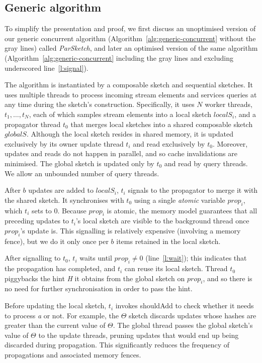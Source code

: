 \subsection{Generic algorithm}
\label{sec:basic-generic-alg}

To simplify the presentation and proof, we first discuss an unoptimised version of
our generic concurrent algorithm (Algorithm~\ref{alg:generic-concurrent} without the gray lines)  called 
\emph{ParSketch},
and later an optimised version of the same algorithm (Algorithm~\ref{alg:generic-concurrent} including the gray lines
and excluding underscored line~\ref{l:signal}).

The algorithm is instantiated by a composable sketch and sequential sketches.
It uses multiple threads to process incoming stream elements 
and services queries at any time during the sketch's construction.
Specifically, it uses $N$ worker threads, $t_1,\dots,t_N$, each of which samples
stream elements into a local sketch $localS_i$, and a propagator thread $t_0$ that merges local sketches
into a shared composable sketch $globalS$. Although the local sketch resides in
shared memory, it is updated exclusively by its owner update thread $t_i$ and 
read exclusively by $t_0$. Moreover, updates and reads do not happen in
parallel, and so cache invalidations are minimised. The global sketch is updated only by $t_0$
and read by query threads. We allow an unbounded number of query threads. 

After $b$ updates are added to $localS_i$, $t_i$ signals to the propagator to merge
it with the shared sketch. It synchronises with $t_0$ using a 
single \emph{atomic} variable $prop_i$, which $t_i$ sets to 0.  
Because $prop_i$ is atomic, the memory model
guarantees that all preceding updates to $t_i$'s local sketch are visible to
the background thread once $prop_i$'s update is.
This signalling is relatively expensive (involving a memory fence),  
but we do it only once per $b$ items retained in the local sketch.

After signalling to $t_0$, $t_i$ waits
until $prop_i \neq 0$  (line~\ref{l:wait}); 
this indicates that the propagation has completed, and $t_i$ can 
reuse its local sketch. Thread $t_0$ piggybacks the hint \emph{H} it
obtains from the global sketch on $prop_i$,
and so there is no need for further synchronisation in order to pass the hint.

Before updating the local sketch, $t_i$ invokes shouldAdd to check
whether it needs to process \emph{a} or not. For example, the $\Theta$ sketch discards updates whose hashes are
greater than the current value of $\Theta$. The global thread passes the global sketch's
value of $\Theta$ to the update threads, pruning updates that would end up being discarded
during propagation. This significantly
reduces the frequency of propagations and associated memory fences.

